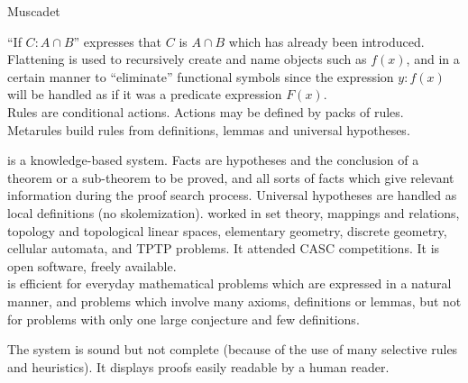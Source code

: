\begin{entry}{Muscadet}
\begin{clarifications}
``If $C:A \cap B$'' expresses that $C$ is 
$A \cap B$ which has already been introduced.
Flattening is used to recursively create and name objects such as $f(x)$,
and in a certain manner to ``eliminate'' functional symbols since
the expression ${y:f(x)}$ will be handled as if 
it was a predicate expression $F(x)$. \\
Rules are conditional actions. Actions may be defined by packs of rules. 
Metarules build rules from definitions, lemmas and universal hypotheses. 
\end{clarifications}

\begin{history}
{\sc \Muscadet} \cite{pastre:1989,pastre:1993} is a knowledge-based system.
Facts are hypotheses and the conclusion 
of a theorem or a sub-theorem to be proved,
and all sorts of facts which give relevant information
during the proof search process.
Universal hypotheses are handled as local definitions (no skolemization). 
\Muscadet worked in set theory, mappings and relations, 
topology and topological linear spaces, elementary geometry, discrete geometry, 
cellular automata, and TPTP problems. 
It attended CASC competitions.
It is open software, freely available.\\
\Muscadet is efficient for everyday mathematical problems 
which are expressed in a natural manner,
and problems which involve many axioms, definitions or lemmas, 
but not  for problems with only one large conjecture and few definitions.
\end{history}

\begin{technicalities}
The system is sound but not complete (because of the use of many 
selective rules and heuristics).
It displays proofs easily readable by a human reader.
\end{technicalities}
\nocite{pastre:2011}

\end{entry}


